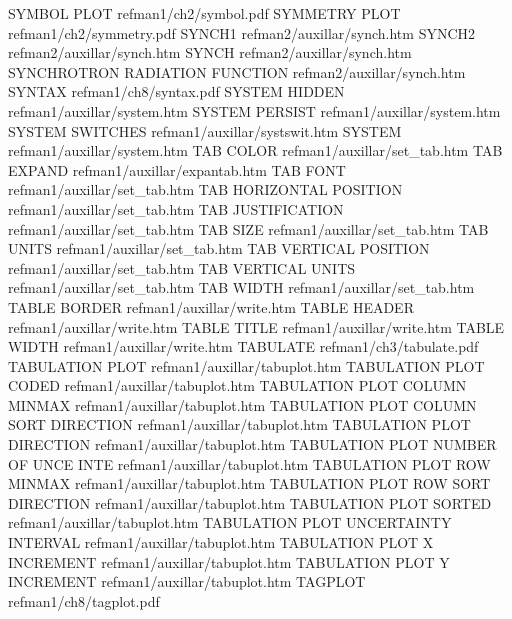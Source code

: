 SYMBOL PLOT                             refman1/ch2/symbol.pdf
SYMMETRY PLOT                           refman1/ch2/symmetry.pdf
SYNCH1                                  refman2/auxillar/synch.htm
SYNCH2                                  refman2/auxillar/synch.htm
SYNCH                                   refman2/auxillar/synch.htm
SYNCHROTRON RADIATION FUNCTION          refman2/auxillar/synch.htm
SYNTAX                                  refman1/ch8/syntax.pdf
SYSTEM HIDDEN                           refman1/auxillar/system.htm
SYSTEM PERSIST                          refman1/auxillar/system.htm
SYSTEM SWITCHES                         refman1/auxillar/systswit.htm
SYSTEM                                  refman1/auxillar/system.htm
TAB COLOR                               refman1/auxillar/set_tab.htm
TAB EXPAND                              refman1/auxillar/expantab.htm
TAB FONT                                refman1/auxillar/set_tab.htm
TAB HORIZONTAL POSITION                 refman1/auxillar/set_tab.htm
TAB JUSTIFICATION                       refman1/auxillar/set_tab.htm
TAB SIZE                                refman1/auxillar/set_tab.htm
TAB UNITS                               refman1/auxillar/set_tab.htm
TAB VERTICAL POSITION                   refman1/auxillar/set_tab.htm
TAB VERTICAL UNITS                      refman1/auxillar/set_tab.htm
TAB WIDTH                               refman1/auxillar/set_tab.htm
TABLE BORDER                            refman1/auxillar/write.htm
TABLE HEADER                            refman1/auxillar/write.htm
TABLE TITLE                             refman1/auxillar/write.htm
TABLE WIDTH                             refman1/auxillar/write.htm
TABULATE                                refman1/ch3/tabulate.pdf
TABULATION PLOT                         refman1/auxillar/tabuplot.htm
TABULATION PLOT CODED                   refman1/auxillar/tabuplot.htm
TABULATION PLOT COLUMN MINMAX           refman1/auxillar/tabuplot.htm
TABULATION PLOT COLUMN SORT DIRECTION   refman1/auxillar/tabuplot.htm
TABULATION PLOT DIRECTION               refman1/auxillar/tabuplot.htm
TABULATION PLOT NUMBER OF UNCE INTE     refman1/auxillar/tabuplot.htm
TABULATION PLOT ROW MINMAX              refman1/auxillar/tabuplot.htm
TABULATION PLOT ROW SORT DIRECTION      refman1/auxillar/tabuplot.htm
TABULATION PLOT SORTED                  refman1/auxillar/tabuplot.htm
TABULATION PLOT UNCERTAINTY INTERVAL    refman1/auxillar/tabuplot.htm
TABULATION PLOT X INCREMENT             refman1/auxillar/tabuplot.htm
TABULATION PLOT Y INCREMENT             refman1/auxillar/tabuplot.htm
TAGPLOT                                 refman1/ch8/tagplot.pdf
